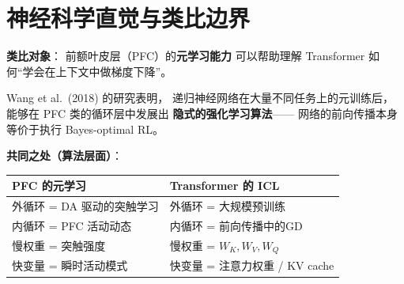 \section{神经科学直觉与类比边界}
\label{sec:icl_neuro}

\begin{neurosciencebox}[title=神经科学直觉：元学习与大脑的``学会如何学习'']

\textbf{类比对象}：
前额叶皮层（PFC）的\textbf{元学习能力}
可以帮助理解 Transformer 如何``学会在上下文中做梯度下降''。

Wang et al.\ (2018) 的研究表明，
递归神经网络在大量不同任务上的元训练后，
能够在 PFC 类的循环层中发展出
\textbf{隐式的强化学习算法}——
网络的前向传播本身等价于执行 Bayes-optimal RL。

\textbf{共同之处（算法层面）}：
\begin{center}
\begin{tabular}{p{5.5cm} p{5.5cm}}
\toprule
\textbf{PFC 的元学习} & \textbf{Transformer 的 ICL} \\
\midrule
外循环 = DA 驱动的突触学习 & 外循环 = 大规模预训练 \\
内循环 = PFC 活动动态 & 内循环 = 前向传播中的GD \\
慢权重 = 突触强度 & 慢权重 = $W_K, W_V, W_Q$ \\
快变量 = 瞬时活动模式 & 快变量 = 注意力权重 / KV cache \\
\bottomrule
\end{tabular}
\end{center}

\end{neurosciencebox}

